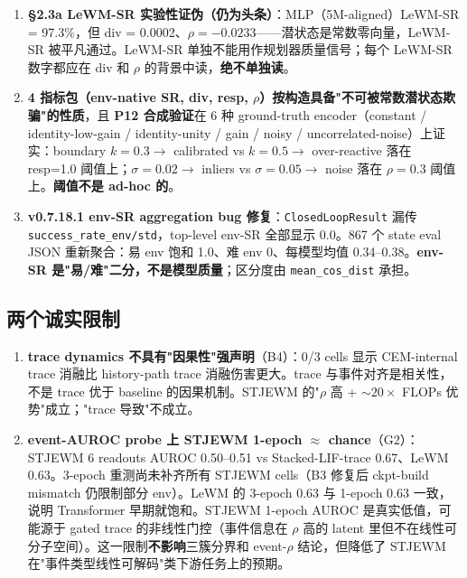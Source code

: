 \documentclass[11pt,a4paper]{article}
\begin{document}
\begin{enumerate}[leftmargin=2em]
    \item \textbf{§2.3a LeWM-SR 实验性证伪（仍为头条）}：MLP（5M-aligned）LeWM-SR = 97.3\%，但 div = 0.0002、$\rho = -0.0233$——潜状态是常数零向量，LeWM-SR 被平凡通过。LeWM-SR 单独不能用作规划器质量信号；每个 LeWM-SR 数字都应在 div 和 $\rho$ 的背景中读，\textbf{绝不单独读}。
    \item \textbf{4 指标包（env-native SR, div, resp, $\rho$）按构造具备"不可被常数潜状态欺骗"的性质}，且 \textbf{P12 合成验证}在 6 种 ground-truth encoder（constant / identity-low-gain / identity-unity / gain / noisy / uncorrelated-noise）上证实：boundary $k=0.3 \to$ calibrated vs $k=0.5 \to$ over-reactive 落在 resp=1.0 阈值上；$\sigma=0.02 \to$ inliers vs $\sigma=0.05 \to$ noise 落在 $\rho=0.3$ 阈值上。\textbf{阈值不是 ad-hoc 的}。
    \item \textbf{v0.7.18.1 env-SR aggregation bug 修复}：\texttt{ClosedLoopResult} 漏传 \texttt{success\_rate\_env/std}，top-level env-SR 全部显示 0.0。867 个 state eval JSON 重新聚合：易 env 饱和 1.0、难 env 0、每模型均值 0.34--0.38。\textbf{env-SR 是"易/难"二分，不是模型质量}；区分度由 \texttt{mean\_cos\_dist} 承担。
\end{enumerate}

\subsection{两个诚实限制}

\begin{enumerate}[leftmargin=2em]
\item \textbf{trace dynamics 不具有"因果性"强声明}（B4）：0/3 cells 显示 CEM-internal trace 消融比 history-path trace 消融伤害更大。trace 与事件对齐是相关性，不是 trace 优于 baseline 的因果机制。STJEWM 的"$\rho$ 高 + $\sim 20\times$ FLOPs 优势"成立；"trace 导致"不成立。
    \item \textbf{event-AUROC probe 上 STJEWM 1-epoch $\approx$ chance}（G2）：STJEWM 6 readouts AUROC 0.50--0.51 vs Stacked-LIF-trace 0.67、LeWM 0.63。3-epoch 重测尚未补齐所有 STJEWM cells（B3 修复后 ckpt-build mismatch 仍限制部分 env）。LeWM 的 3-epoch 0.63 与 1-epoch 0.63 一致，说明 Transformer 早期就饱和。STJEWM 1-epoch AUROC 是真实低值，可能源于 gated trace 的非线性门控（事件信息在 $\rho$ 高的 latent 里但不在线性可分子空间）。这一限制\textbf{不影响}三簇分界和 event-$\rho$ 结论，但降低了 STJEWM 在"事件类型线性可解码"类下游任务上的预期。
\end{enumerate}
\end{document}

